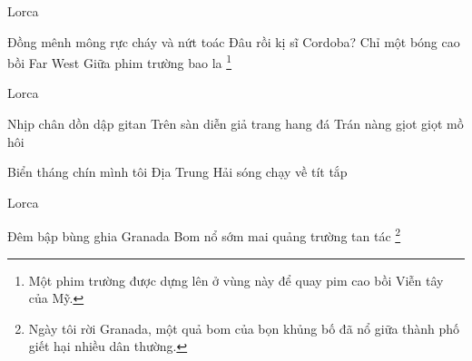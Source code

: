 \documentclass[../main.tex]{subfiles}
\begin{document}
\begin{multicols}{2}
\begin{blockquote}
Lorca 
        
Đồng mênh mông rực cháy và nứt toác        
Đâu rồi kị sĩ Cordoba?        
Chỉ một bóng cao bồi Far West        
Giữa phim trường bao la \footnote{
Một phim trường được dựng lên ở vùng này để quay pim cao bồi Viễn tây của Mỹ.}  
        
Lorca 
        
Nhịp chân dồn dập gitan        
Trên sàn diễn giả trang hang đá        
Trán nàng gịot giọt mồ hôi 
        
Biển tháng chín mình tôi        
Địa Trung Hải sóng chạy về tít tắp 
        
Lorca 
        
Đêm bập bùng ghia Granada        
Bom nổ sớm mai quảng trường tan tác \footnote{
Ngày tôi rời Granada, một quả bom của bọn khủng bố đã nổ giữa thành phố giết hại nhiều dân thường.}  

\end{blockquote}
 



\end{multicols}
\end{document}
